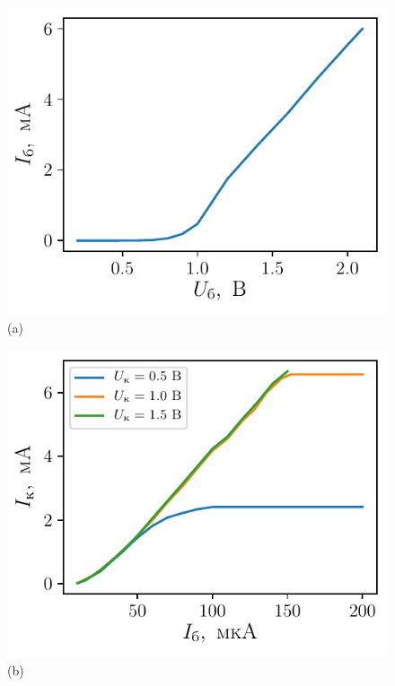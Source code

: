 \begin{figure}[H]
    \begin{minipage}{0.49\linewidth}
        \centering
        \includegraphics[scale=1]{fig/1.pdf}
        \newline
        (a)
    \end{minipage}
    \label{fig:1}
    \hfill
    \begin{minipage}{0.49\linewidth}
        \centering
        \includegraphics[scale=1]{fig/2.pdf}
        \newline
        (b)
    \end{minipage}

\end{figure}
